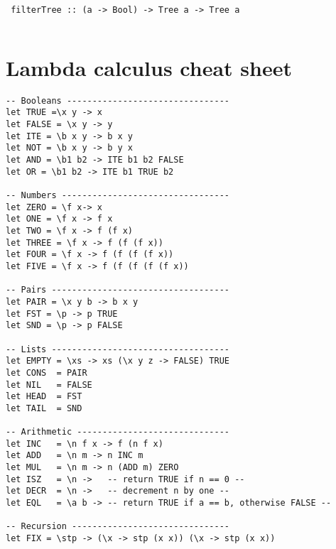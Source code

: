 \documentclass[paper=letter, fontsize=13pt]{article} %
\numberwithin{equation}{section} %
\newif\ifshowanswers\showanswersfalse
\begin{document}
\begin{enumerate}
\begin{verbatim}
 filterTree :: (a -> Bool) -> Tree a -> Tree a
\end{verbatim}

\ifshowanswers 
\begin{lstlisting}
 filterTree p Leaf = Leaf
 filterTree p (Node v l r) | p v = 
   Node v (filterTree p l) (filterTree p r) 
 filterTree p (Node v l r) | otherwise = 
   case filterTree p l of 
     Leaf -> filterTree p r
     fl   -> case filterTree p r of
               Leaf -> fl
               fr   -> joinTree fl fr
\end{lstlisting}
    \else
     \bigskip
     \bigskip
     \bigskip 
     \bigskip
     \bigskip 
     \bigskip
     \bigskip
     \bigskip 
     \bigskip
     \bigskip
    \fi
 

\end{enumerate}
\newpage
\[ \]
\newpage
\section{Lambda calculus cheat sheet}
\begin{lstlisting}
-- Booleans --------------------------------
let TRUE =\x y -> x
let FALSE = \x y -> y
let ITE = \b x y -> b x y
let NOT = \b x y -> b y x
let AND = \b1 b2 -> ITE b1 b2 FALSE 
let OR = \b1 b2 -> ITE b1 TRUE b2

-- Numbers ---------------------------------
let ZERO = \f x-> x
let ONE = \f x -> f x 
let TWO = \f x -> f (f x) 
let THREE = \f x -> f (f (f x))
let FOUR = \f x -> f (f (f (f x))
let FIVE = \f x -> f (f (f (f (f x))

-- Pairs -----------------------------------
let PAIR = \x y b -> b x y 
let FST = \p -> p TRUE 
let SND = \p -> p FALSE

-- Lists -----------------------------------
let EMPTY = \xs -> xs (\x y z -> FALSE) TRUE
let CONS  = PAIR
let NIL   = FALSE
let HEAD  = FST
let TAIL  = SND

-- Arithmetic ------------------------------
let INC   = \n f x -> f (n f x)
let ADD   = \n m -> n INC m 
let MUL   = \n m -> n (ADD m) ZERO
let ISZ   = \n ->   -- return TRUE if n == 0 --
let DECR  = \n ->   -- decrement n by one --  
let EQL   = \a b -> -- return TRUE if a == b, otherwise FALSE --

-- Recursion -------------------------------
let FIX = \stp -> (\x -> stp (x x)) (\x -> stp (x x))
\end{lstlisting}

\newpage
\end{document}
